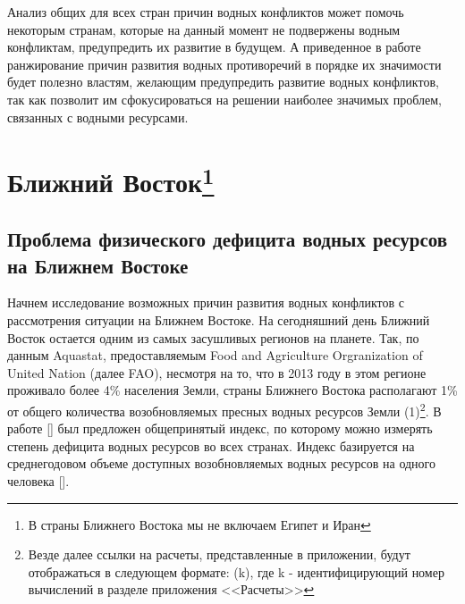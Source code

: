 \documentclass[a4paper, 12pt]{article}
\theoremstyle{plain} %
\theoremstyle{definition} %
\theoremstyle{remark} %
\begin{document}
Анализ общих для всех стран причин водных конфликтов может помочь некоторым странам, которые на данный момент не подвержены водным конфликтам, предупредить их развитие в будущем. А приведенное в работе ранжирование причин развития водных противоречий в порядке их значимости будет полезно властям, желающим предупредить развитие водных конфликтов, так как позволит им сфокусироваться на решении наиболее значимых проблем, связанных с водными ресурсами.

\section[Ближний Восток]{Ближний Восток\footnote{В страны Ближнего Востока мы не включаем Египет и Иран}}
\subsection{Проблема физического дефицита водных ресурсов на Ближнем Востоке
}
Начнем исследование возможных причин развития водных конфликтов с рассмотрения ситуации на Ближнем Востоке. На сегодняшний день Ближний Восток остается одним из самых засушливых регионов на планете. Так, по данным Aquastat, предоставляемым Food and Agriculture Orgranization of United Nation (далее FAO), несмотря на то, что в 2013 году в этом регионе проживало более 4\% населения Земли, страны Ближнего Востока располагают 1\% от общего количества возобновляемых пресных водных ресурсов Земли (1)\footnote{Везде далее ссылки на расчеты, представленные в приложении, будут отображаться в следующем формате: (k), где k - идентифицирующий номер вычислений в разделе приложения <<Расчеты>>}. В работе [\cite{falkenmark}] был предложен общепринятый индекс, по которому можно измерять степень дефицита водных ресурсов во всех странах. Индекс базируется на среднегодовом объеме доступных возобновляемых водных ресурсов на одного человека [\cite{brown2011}].
\end{document}
